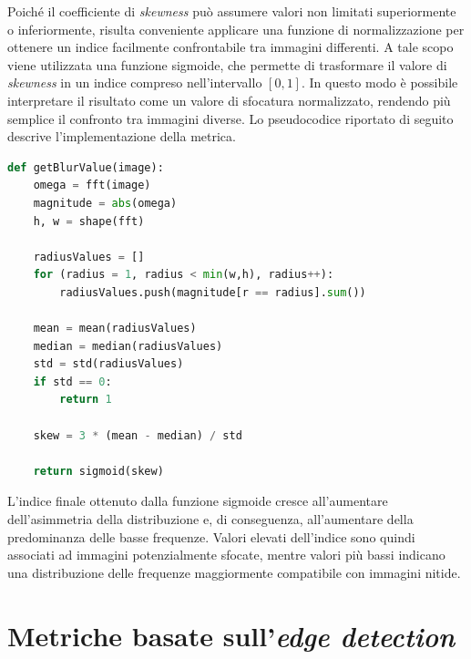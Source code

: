 \documentclass[
    target=bach,
    aauheader=,
    style=
]{thud}
\begin{document}
Poiché il coefficiente di \textit{skewness} può assumere valori non limitati superiormente o inferiormente, risulta conveniente applicare una funzione di normalizzazione per ottenere un indice facilmente confrontabile tra immagini differenti. A tale scopo viene utilizzata una funzione sigmoide, che permette di trasformare il valore di \textit{skewness} in un indice compreso nell'intervallo $[0,1]$. In questo modo è possibile interpretare il risultato come un valore di sfocatura normalizzato, rendendo più semplice il confronto tra immagini diverse. Lo pseudocodice riportato di seguito descrive l'implementazione della metrica.

\begin{lstlisting}[language=python]
def getBlurValue(image):
    omega = fft(image)
    magnitude = abs(omega)
    h, w = shape(fft)

    radiusValues = []
    for (radius = 1, radius < min(w,h), radius++):
        radiusValues.push(magnitude[r == radius].sum())

    mean = mean(radiusValues)
    median = median(radiusValues)
    std = std(radiusValues)
    if std == 0:
        return 1

    skew = 3 * (mean - median) / std

    return sigmoid(skew)
\end{lstlisting}

L'indice finale ottenuto dalla funzione sigmoide cresce all'aumentare dell'asimmetria della distribuzione e, di conseguenza, all'aumentare della predominanza delle basse frequenze. Valori elevati dell'indice sono quindi associati ad immagini potenzialmente sfocate, mentre valori più bassi indicano una distribuzione delle frequenze maggiormente compatibile con immagini nitide.

\section{Metriche basate sull'\textit{edge detection}}
\label{mbsed}
\end{document}
